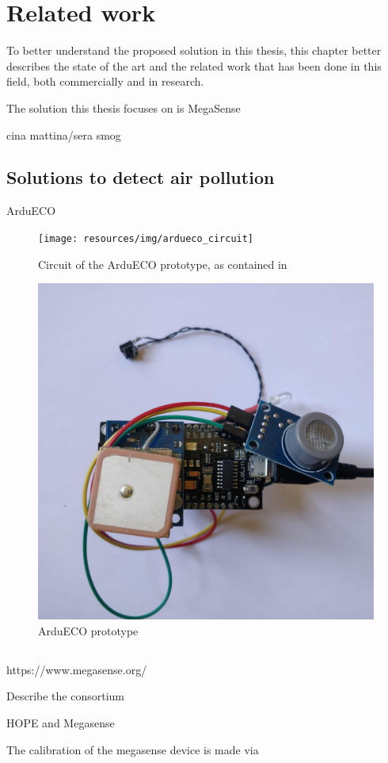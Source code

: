 
\chapter{Related work}\label{chapter:related_work}

	To better understand the proposed solution in this thesis, this chapter better describes the state of the art and the related work that has been done in this field, both commercially and in research.
	
	
	
	
	
	The solution this thesis focuses on is MegaSense
	
	cina mattina/sera smog
	
	\section{Solutions to detect air pollution}
	
	
	ArduECO
	
	\begin{figure}
		\centering
		\texttt{[image: resources/img/ardueco\_circuit]}
		\caption{Circuit of the ArduECO prototype, as contained in \cite{ardueco_paper}}
	\end{figure}
	
	\begin{figure}
		\centering
		\includegraphics[width=.5\textwidth]{resources/img/ardueco_picture}
		\caption{ArduECO prototype}
	\end{figure}
	
	\section{\megasense}\label{sec:megasense}
	
	
	https://www.megasense.org/
	
	Describe the consortium
	
	HOPE and Megasense
	
	The calibration of the megasense device is made via